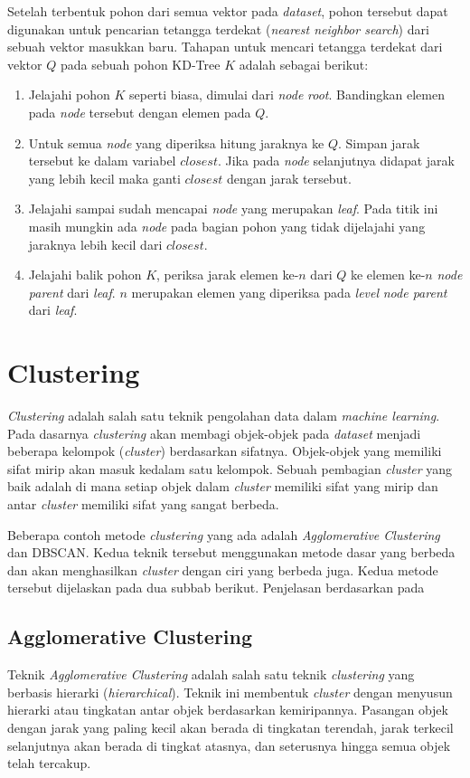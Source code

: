 Setelah terbentuk pohon dari semua vektor pada \textit{dataset}, pohon tersebut dapat digunakan untuk pencarian tetangga terdekat (\textit{nearest neighbor search}) dari sebuah vektor masukkan baru. Tahapan untuk mencari tetangga terdekat dari vektor $Q$ pada sebuah pohon KD-Tree $K$ adalah sebagai berikut:
\begin{enumerate}
	\item Jelajahi pohon $K$ seperti biasa, dimulai dari \textit{node} \textit{root}. Bandingkan elemen pada \textit{node} tersebut dengan elemen pada $Q$. 
	\item Untuk semua \textit{node} yang diperiksa hitung jaraknya ke $Q$. Simpan jarak tersebut ke dalam variabel $closest$. Jika pada \textit{node} selanjutnya didapat jarak yang lebih kecil maka ganti $closest$ dengan jarak tersebut.
	\item Jelajahi sampai sudah mencapai \textit{node} yang merupakan \textit{leaf}. Pada titik ini masih mungkin ada \textit{node} pada bagian pohon yang tidak dijelajahi yang jaraknya lebih kecil dari $closest$.
	\item Jelajahi balik pohon $K$, periksa jarak elemen ke-$n$ dari $Q$ ke elemen ke-$n$ \textit{node parent} dari \textit{leaf}. $n$ merupakan elemen yang diperiksa pada \textit{level} \textit{node parent} dari \textit{leaf}. 
\end{enumerate}

\section{Clustering}
\label{sec:clustering}
\textit{Clustering} adalah salah satu teknik pengolahan data dalam \textit{machine learning}. Pada dasarnya \textit{clustering} akan membagi objek-objek pada \textit{dataset}  menjadi beberapa kelompok (\textit{cluster}) berdasarkan sifatnya. Objek-objek yang memiliki sifat mirip akan masuk kedalam satu kelompok. Sebuah pembagian \textit{cluster} yang baik adalah di mana setiap objek dalam \textit{cluster} memiliki sifat yang mirip dan antar \textit{cluster} memiliki sifat yang sangat berbeda.

Beberapa contoh metode \textit{clustering} yang ada adalah \textit{Agglomerative Clustering} dan DBSCAN. Kedua teknik tersebut menggunakan metode dasar yang berbeda dan akan menghasilkan \textit{cluster} dengan ciri yang berbeda juga. Kedua metode tersebut dijelaskan pada dua subbab berikut. Penjelasan berdasarkan pada~\cite{han2011data}

\subsection{Agglomerative Clustering}
\label{subsec:clustering_agglomerative}
Teknik \textit{Agglomerative Clustering} adalah salah satu teknik \textit{clustering} yang berbasis hierarki (\textit{hierarchical}). Teknik ini membentuk \textit{cluster} dengan menyusun hierarki atau tingkatan antar objek berdasarkan kemiripannya. Pasangan objek dengan jarak yang paling kecil akan berada di tingkatan terendah, jarak terkecil selanjutnya akan berada di tingkat atasnya, dan seterusnya hingga semua objek telah tercakup. 

